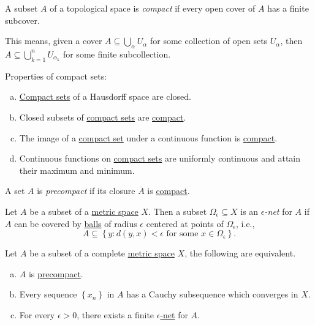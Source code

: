 \begin{definition}[Compact]\label{def:compact}
	A subset \(A\) of a topological space is \emph{compact} if every open cover of \(A\) has a finite subcover.
\end{definition}

This means, given a cover \(A \subseteq \bigcup_{\alpha} U_\alpha \) for some collection of open sets \(U_\alpha \), then \(A \subseteq \bigcup_{k=1}^{n} U_{\alpha _k}\) for some finite subcollection.

\begin{remark}
	Properties of compact sets:
	\begin{enumerate}[(a)]
		\item \hyperref[def:compact]{Compact sets} of a Hausdorff space are closed.
		\item Closed subsets of \hyperref[def:compact]{compact sets} are \hyperref[def:compact]{compact}.
		\item The image of a \hyperref[def:compact]{compact set} under a continuous function is \hyperref[def:compact]{compact}.
		\item Continuous functions on \hyperref[def:compact]{compact sets} are uniformly continuous and attain their maximum and minimum.
	\end{enumerate}
\end{remark}

\begin{definition}[Precompact]\label{def:precompact}
	A set \(A\) is \emph{precompact} if its closure \(\overline{A} \) is \hyperref[def:compact]{compact}.
\end{definition}

\begin{definition}\label{def:eps-net}
	Let \(A\) be a subset of a \hyperref[prev:metric]{metric space} \(X\). Then a subset \(\Omega _{\epsilon } \subseteq X\) is an \emph{\(\epsilon \)-net} for \(A\) if \(A\) can be covered by \hyperref[def:ball]{balls} of radius \(\epsilon \) centered at points of \(\Omega _{\epsilon }\), i.e.,
	\[
		A \subseteq \left\{ y\colon d(y, x) < \epsilon \text{ for some } x\in \Omega _\epsilon  \right\}.
	\]
\end{definition}

\begin{theorem}\label{thm:precompact}
	Let \(A\) be a subset of a complete \hyperref[prev:metric]{metric space} \(X\), the following are equivalent.
	\begin{enumerate}[(a)]
		\item \(A\) is \hyperref[def:precompact]{precompact}.
		\item Every sequence \(\left\{ x_n \right\} \)  in \(A\) has a Cauchy subsequence which converges in \(X\).
		\item For every \(\epsilon > 0\), there exists a finite \hyperref[def:eps-net]{\(\epsilon \)-net} for \(A\).
	\end{enumerate}
\end{theorem}

